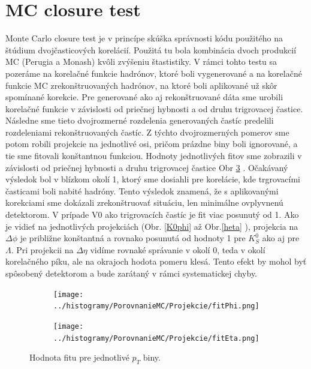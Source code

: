 \documentclass[thesismargins, thesislinespacing]{rnthesis}
\begin{document}
\section{MC closure test}

Monte Carlo closure test je v princípe skúška správnosti kódu použitého na štúdium dvojčasticových korelácií. Použitá tu bola kombinácia dvoch produkcií MC (Perugia a Monash) kvôli zvýšeniu štastistiky. V rámci tohto testu sa pozeráme na korelačné funkcie hadrónov, ktoré boli vygenerované a na korelačné funkcie MC zrekonštruovaných hadrónov, na ktoré boli aplikované už skôr spomínané korekcie. Pre generované ako aj rekonštruované dáta sme urobili korelačné funkcie v závislosti od priečnej hybnosti  a od druhu trigrovacej častice. Následne sme tieto dvojrozmerné rozdelenia generovaných častíc predelili rozdeleniami rekonštruovaných častíc. Z týchto dvojrozmerných pomerov sme potom robili projekcie na jednotlivé osi, pričom prázdne biny boli ignorované, a tie sme fitovali konštantnou funkciou. Hodnoty jednotlivých fitov sme zobrazili v závislosti od priečnej hybnosti a druhu trigrovacej častice Obr \ref{fitMC} . Očakávaný výsledok bol v blízkom okolí 1, ktorý sme dosiahli pre korelácie, kde trgrovacími časticami boli nabité hadróny. Tento výsledok znamená, že s aplikovanými korekciami sme dokázali zrekonštruovať situáciu, len minimálne ovplyvnenú detektorom.
V prípade V0 ako trigrovacích častíc je fit viac posunutý od 1. Ako je vidieť na jednotlivých projekciách (Obr. \ref{K0phi}  až Obr.\ref{heta}  ), projekcia na $\Delta \phi$ je približne konštantná a rovnako posunutá od hodnoty 1 pre $K^0_S$ ako aj pre $\Lambda$. Pri projekcii na $\Delta \eta$ vidíme rovnaké správanie v okolí 0, teda v okolí korelačného píku, ale na okrajoch hodota pomeru klesá. Tento efekt by mohol byť spôsobený detektorom a bude zarátaný v rámci systematickej chyby. 

\begin{figure}
	\centering
	\begin{subfigure}{0.5\textwidth}
		\centering
		\texttt{[image: ../histogramy/PorovnanieMC/Projekcie/fitPhi.png]}
		\caption{}
		\label{fitPhi}
	\end{subfigure}%
	\begin{subfigure}{0.5\textwidth}
		\centering
		\texttt{[image: ../histogramy/PorovnanieMC/Projekcie/fitEta.png]}
		\caption{}
		\label{fitEta}
	\end{subfigure}
	\caption{Hodnota fitu pre jednotlivé $p_T$ biny.}
	\label{fitMC}
\end{figure}
\end{document}
